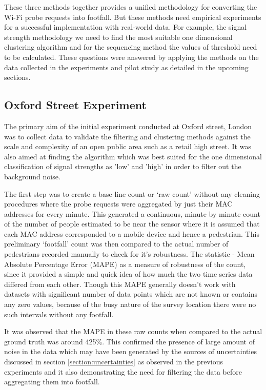 These three methods together provides a unified methodology for converting the Wi-Fi probe requests into footfall.
But these methods need empirical experiments for a successful implementation with real-world data.
For example, the signal strength methodology we need to find the most suitable one dimensional clustering algorithm and for the sequencing method the values of threshold need to be calculated.
These questions were answered by applying the methods on the data collected in the experiments and pilot study as detailed in the upcoming sections.

\subsection{Oxford Street Experiment}

The primary aim of the initial experiment conducted at Oxford street, London was to collect data to validate the filtering and clustering methods against the scale and complexity of an open public area such as a retail high street.
It was also aimed at finding the algorithm which was best suited for the one dimensional classification of signal strengths as 'low' and 'high' in order to filter out the background noise.

The first step was to create a base line count or `raw count' without any cleaning procedures where the probe requests were aggregated  by just their MAC addresses for every minute.
This generated a continuous, minute by minute count of the number of people estimated to be near the sensor where it is assumed that each MAC address corresponded to a mobile device and hence a pedestrian.
This preliminary `footfall' count was then compared to the actual number of pedestrians recorded manually to check for it's robustness.
The statistic - Mean Absolute Percentage Error (MAPE) as a measure of robustness of the count, since it provided a simple and quick idea of how much the two time series data differed from each other.
Though this MAPE generally doesn't work with datasets with significant number of data points which are not known or contains any zero values, because of the busy nature of the survey location there were no such intervals without any footfall.

It was observed that the MAPE in these raw counts when compared to the actual ground truth was around 425\%.
This confirmed the presence of large amount of noise in the data which may have been generated by the sources of uncertainties discussed in section \ref{section:uncertainties} as observed in the previous experiments and it also demonstrating the need for filtering the data before aggregating them into footfall.
 
